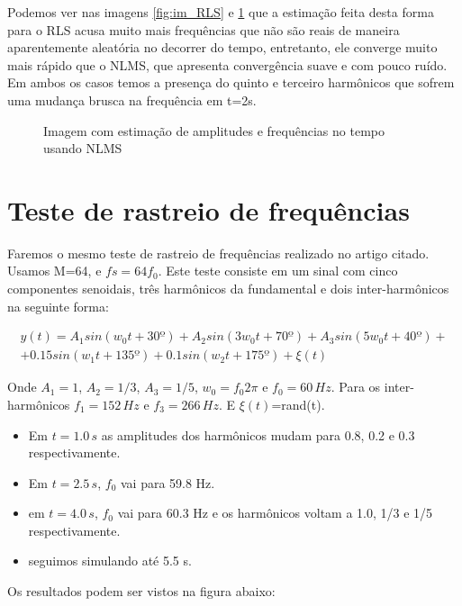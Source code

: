 Podemos ver nas imagens \ref{fig:im_RLS} e \ref{fig:im_NLMS} que a estimação feita desta forma para o RLS acusa muito mais frequências que não são reais de maneira aparentemente aleatória no decorrer do tempo, entretanto, ele converge muito mais rápido que o NLMS, que apresenta convergência suave e com pouco ruído. Em ambos os casos temos a presença do quinto e terceiro harmônicos que sofrem uma mudança brusca na frequência em t=2s.


\begin{figure}[H]
	\centering    
	\def\svgwidth{\columnwidth}
	
	\caption{Imagem com estimação de amplitudes e frequências no tempo usando NLMS}
	\label{fig:im_NLMS}
\end{figure}


\section{Teste de rastreio de frequências}

Faremos o mesmo teste de rastreio de frequências realizado no artigo citado. Usamos M=64, e $fs=64f_0$. Este teste consiste em um sinal com cinco componentes senoidais, três harmônicos da fundamental e dois inter-harmônicos na seguinte forma:

\begin{equation}
\begin{split}
	y(t)=A_1 sin(w_0 t+30º)+A_2 sin(3w_0 t+70º)+ A_3 sin(5w_0 t+40º) + \\ + 0.15 sin(w_1 t+135º)+ 0.1 sin(w_2 t + 175º) + \xi(t)
\end{split}
\end{equation}

Onde $A_1=1$, $A_2=1/3$, $A_3=1/5$, $w_0=f_0 2 \pi$ e $f_0=60 \, Hz$. Para os inter-harmônicos $f_1=152 \, Hz$ e $f_3= 266 \, Hz$. E $\xi(t)$=rand(t). 
\begin{itemize}
	\item Em $t=1.0 \,s$ as amplitudes dos harmônicos mudam para 0.8, 0.2 e 0.3 respectivamente. 
	\item Em $t=2.5 \,s$, $f_0$ vai para 59.8 Hz.
	\item em $t=4.0 \,s$, $f_0$ vai para 60.3 Hz e os harmônicos voltam a 1.0, 1/3 e 1/5 respectivamente.
	\item seguimos simulando até 5.5 s.
\end{itemize}

Os resultados podem ser vistos na figura abaixo: 

